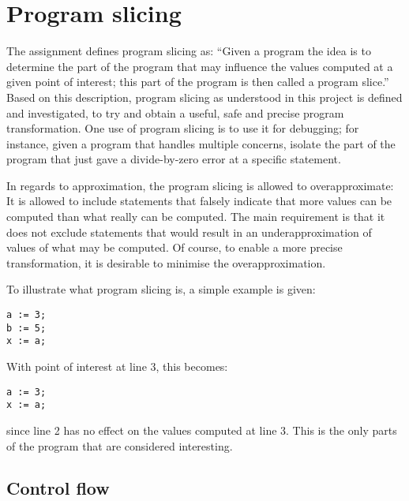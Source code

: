 \section{Program slicing}

The assignment defines program slicing  as:
``Given a program the idea is to determine the part of the program that may influence the values
computed at a given point of interest; this part of the program is then called a program slice.''
Based on this description, program slicing as understood in this project is defined and investigated,
to try and obtain a useful, safe and precise program transformation.
One use of program slicing is to use it for debugging; for instance, given a program that handles
multiple concerns, isolate the part of the program that just gave a divide-by-zero error at a
specific statement.

In regards to approximation, the program slicing is allowed to overapproximate: It is allowed to include statements
that falsely indicate that more values can be computed than what really can be computed.
The main requirement is that it does not exclude statements that would result in an underapproximation
of values of what may be computed. Of course, to enable a more precise transformation, it is desirable
to minimise the overapproximation.

To illustrate what program slicing is, a simple example is given:
\begin{lstlisting}
a := 3;
b := 5;
x := a;
\end{lstlisting}
With point of interest at line 3, this becomes:
\begin{lstlisting}
a := 3;
x := a;
\end{lstlisting}
since line 2 has no effect on the values computed at line 3.
This is the only parts of the program that are considered interesting.

\subsection{Control flow}

